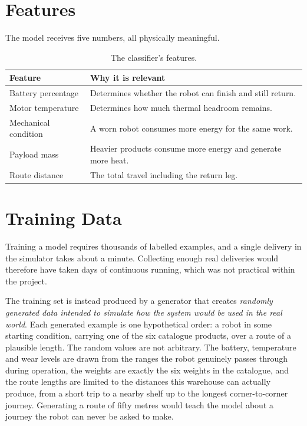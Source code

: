 \documentclass[12pt,a4paper]{report}
\begin{document}
\section{Features}
The model receives five numbers, all physically meaningful.

\begin{table}[H]
\centering
\begin{tabular}{@{}lp{}@{}}
\toprule
\textbf{Feature} & \textbf{Why it is relevant} \\
\midrule
Battery percentage & Determines whether the robot can finish and still return. \\
Motor temperature & Determines how much thermal headroom remains. \\
Mechanical condition & A worn robot consumes more energy for the same work. \\
Payload mass & Heavier products consume more energy and generate more heat. \\
Route distance & The total travel including the return leg. \\
\bottomrule
\end{tabular}
\caption{The classifier's features.}
\label{tab:features}
\end{table}

\section{Training Data}
Training a model requires thousands of labelled examples, and a single delivery in the simulator
takes about a minute. Collecting enough real deliveries would therefore have taken days of
continuous running, which was not practical within the project.

The training set is instead produced by a generator that creates \emph{randomly generated data
intended to simulate how the system would be used in the real world}. Each generated example is one
hypothetical order: a robot in some starting condition, carrying one of the six catalogue products,
over a route of a plausible length. The random values are not arbitrary. The battery, temperature
and wear levels are drawn from the ranges the robot genuinely passes through during operation, the
weights are exactly the six weights in the catalogue, and the route lengths are limited to the
distances this warehouse can actually produce, from a short trip to a nearby shelf up to the longest
corner-to-corner journey. Generating a route of fifty metres would teach the model about a journey
the robot can never be asked to make.
\end{document}
